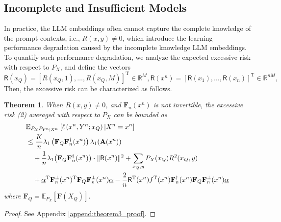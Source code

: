 \documentclass{article} %
\theoremstyle{plain} %
\newtheorem{theorem}{Theorem}[section]      %
\begin{document}
\subsection{Incomplete and Insufficient Models}

In practice, the LLM embeddings often cannot capture the complete knowledge of the prompt contexts, i.e., $R(x,y)\neq0$, which introduce the learning performance degradation caused by the incomplete knowledge LLM embeddings. To quantify such performance degradation, we analyze the expected excessive risk with respect to $P_{X}$, and define the vectors 
\begin{equation*}
    \textsf{R}(x_Q) = \left[ R(x_Q,1) , \ldots , R(x_Q,M)\right]^{\text{T}}
\in \mathbb R^{M}, \textsf{R}(x^n) = \left[ \textsf{R}(x_1) , \ldots , \textsf{R}(x_n)\right]^{\text{T}}
\in \mathbb R^{ nM},
\end{equation*}
Then, the excessive risk can be characterized as follows.

\begin{theorem}\label{thm:incomplete_insufficient}
When $R(x,y)\neq0$, and $\mathbf{F}_n(x^n)$ is not invertible, the excessive risk (2) averaged with respect to $P_{X}$ can be bounded as
\begin{align} \notag
&\mathbb{E}_{P_{X}P_{Y^n|X^n}}\left[
\ell \left(x^n,Y^n;x_Q\right) | X^n = x^n\right]\\ 
&\leq \frac{K}{n}\lambda_1 \left(\mathbf{F}_Q\mathbf{F}_n^\dagger(x^n) \right) \lambda_1(\textbf{A}(x^n))\notag\\
& \quad + \frac1n \lambda_1 \big(\mathbf{F}_Q \mathbf{F}_n^\dagger(x^n)\big)\cdot \| \mathsf{R}(x^n) \|^2 + \sum_{x_Q,y}{P_{X}(x_Q)R^2(x_Q,y)}\label{equ:penalty_term_Q}\\
& \quad + \underline{\alpha}^{\mathrm{T}}\mathbf{F}_n^{\perp}(x^n)^{\mathrm{T}} \mathbf{F}_Q\mathbf{F}_n^{\perp}(x^n)\underline{\alpha} - \frac2n \mathsf{R}^{\mathrm{T}}(x^n)f^{\mathrm{T}}(x^n) \mathbf{F}_n^\dagger(x^n)\mathbf{F}_Q\mathbf{F}_n^{\perp}(x^n)\underline{\alpha} \label{equ:penalty_term}
\end{align}
where $\mathbf{F}_Q = \mathbb E_{P_{X}} [\mathbf{F}(X_Q)]$.
\end{theorem}
\begin{proof}
    See Appendix \ref{append:theorem3_proof}.
\end{proof}
\end{document}
